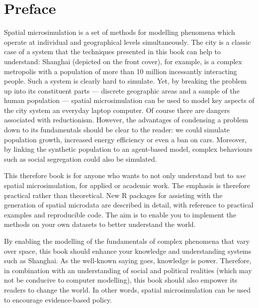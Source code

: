 \chapter*{Preface}

Spatial microsimulation is a set of methods for modelling phenomena which operate
at individual and geographical levels simultaneously.
The city is a classic case of a system that the techniques
presented in this book can help to understand: Shanghai
(depicted on the front cover), for example, is a complex metropolis with a
population of more than 10 million incessantly interacting people. Such a system is clearly hard
to simulate. Yet, by breaking the problem up into its
constituent parts --- discrete geographic areas and a sample of the human
population --- spatial microsimulation can be used to model key aspects of the city system
an everyday laptop computer. Of course there are dangers associated with reductionism.
However, the advantages of condensing a problem down to its fundamentals
should be clear to the reader:
we could simulate population growth, increased energy efficiency or even
a ban on cars. Moreover, by linking the synthetic population
to an agent-based model, complex
behaviours such as social segregation could also be simulated.

This therefore book is for anyone who wants to not only understand
but to \emph{use} spatial microsimulation, for applied or academic work.
The emphasis is therefore practical rather than theoretical.
New R packages for assisting with the generation of spatial microdata are described in
detail, with reference to practical examples and reproducible code.
The aim is to enable you to implement the methods on your own
datasets to better understand the world. 

By enabling the modelling of the fundamentals of
complex phenomena that vary over space,
this book should enhance your knowledge and understanding
systems such as Shanghai.
As the well-known saying goes, knowledge is power.
Therefore, in combination with an understanding of social and
political realities (which may not be conducive to computer modelling),
this book should also empower its readers to change the world.
In other words,
spatial microsimulation can be used to encourage evidence-based policy.


